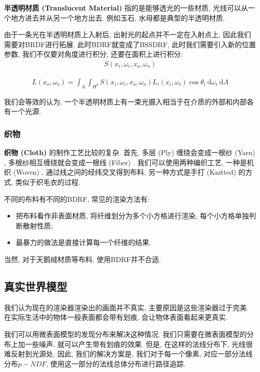 \textbf{半透明材质 (Translucent Material) }指的是能够透光的一些材质, 光线可以从一个地方进去并从另一个地方出去. 例如玉石, 水母都是典型的半透明材质. 

由于一条光在半透明材质上入射后, 出射光的起点并不一定在入射点上, 因此我们需要对BRDF进行拓展. 此时BDRF就变成了BSSDRF, 此时我们需要引入新的位置参数, 我们不仅要对角度进行积分, 还要在面积上进行积分: 
\begin{eqnarray}
	S(x_i,\omega_i,x_o,\omega_o)
\end{eqnarray}

\begin{eqnarray}
	L\left(x_{o}, \omega_{o}\right)=\int_{A} \int_{H^{2}} S\left(x_{i}, \omega_{i}, x_{o}, \omega_{o}\right) L_{i}\left(x_{i}, \omega_{i}\right) \cos \theta_{i} \mathrm{~d} \omega_{i} \mathrm{~d} A
\end{eqnarray}

我们会等效的认为, 一个半透明材质上有一束光摄入相当于在介质的外部和内部各有一个光源. 

\subsubsection{织物}

\textbf{织物 (Cloth) }的制作工艺比较的复杂. 首先, 多层 (Ply) 缠绕会变成一根纱 (Yarn) , 多根纱相互缠绕就会变成一根线 (Fiber) . 我们可以使用两种编织工艺, 一种是机织 (Woven) , 通过线之间的经纬交叉得到布料, 另一种方式是手打 (Knitted) 的方式, 类似于织毛衣的过程. 

不同的布料有不同的BDRF, 常见的渲染方法有: 
\begin{itemize}
	\item 把布料看作非表面材质, 将纤维划分为多个小方格进行渲染, 每个小方格单独判断散射性质; 
	\item 最暴力的做法是直接计算每一个纤维的结果. 
\end{itemize}

当然, 对于天鹅绒材质等布料, 使用BDRF并不合适. 

\subsection{真实世界模型}

我们认为现在的渲染器渲染出的画面并不真实, 主要原因是这些渲染器过于完美. 在实际生活中的物体一般表面都会带有划痕, 会让物体表面看起来更真实. 

我们可以用微表面模型的发现分布来解决这种情况. 我们只需要在微表面模型的分布上加一些噪声, 就可以产生带有划痕的效果. 但是, 在这样的法线分布下, 光线很难反射到光源处. 因此, 我们的解决方案是, 我们对于每一个像素, 对应一部分法线分布$p-NDF$, 使用这一部分的法线总体分布进行路径追踪. 

